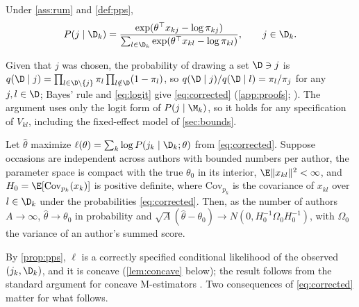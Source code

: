 \begin{proposition}
\label{prop:pps}
Under \cref{ass:rum} and \cref{def:pps},
\begin{equation}
  P(j \mid \D_k) = \frac{\exp(\theta^\top x_{kj} - \log \pi_{kj})}{\sum_{l \in \D_k} \exp(\theta^\top x_{kl} - \log
  \pi_{kl})}, \qquad j \in \D_k.
  \label{eq:corrected}
\end{equation}
\end{proposition}

\noindent Given that $j$ was chosen, the probability of drawing a set $\D \ni j$ is $q(\D \mid j) = \prod_{l \in \D
\setminus \{j\}} \pi_l \prod_{l \notin \D} (1 - \pi_l)$, so $q(\D \mid j)/q(\D \mid l) = \pi_l / \pi_j$ for any $j,
l \in \D$; Bayes' rule and \eqref{eq:logit} give \eqref{eq:corrected} (\cref{app:proofs};
\citealp{mcfadden1978modelling}). The argument uses only the logit form of $P(j \mid \M_k)$, so it holds for any
specification of $V_{kl}$, including the fixed-effect model of \cref{sec:bounds}.

\begin{corollary}
\label{cor:consistency}
Let $\hat\theta$ maximize $\ell(\theta) = \sum_k \log P(j_k \mid \D_k; \theta)$ from \eqref{eq:corrected}. Suppose
occasions are independent across authors with bounded numbers per author, the parameter space is compact with the
true $\theta_0$ in its interior, $\E\|x_{kl}\|^2 < \infty$, and $H_0 = \E[\mathrm{Cov}_{p_k}(x_k)]$ is positive
definite, where $\mathrm{Cov}_{p_k}$ is the covariance of $x_{kl}$ over $l \in \D_k$ under the probabilities
\eqref{eq:corrected}. Then, as the number of authors $A \to \infty$, $\hat\theta \to \theta_0$ in probability and
$\sqrt{A}(\hat\theta - \theta_0) \to N(0, H_0^{-1} \Omega_0 H_0^{-1})$, with $\Omega_0$ the variance of an author's
summed score.
\end{corollary}

\noindent By \cref{prop:pps}, $\ell$ is a correctly specified conditional likelihood of the observed $(j_k, \D_k)$,
and it is concave (\cref{lem:concave} below); the result follows from the standard argument for concave M-estimators
\citep{newey1994large}. Two consequences of \eqref{eq:corrected} matter for what follows.


